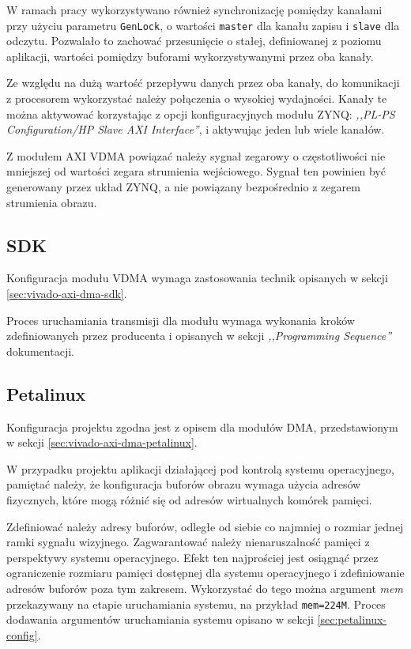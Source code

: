 {W ramach pracy wykorzystywano również synchronizację pomiędzy kanałami przy użyciu parametru \texttt{GenLock}, o wartości \texttt{master} dla kanału zapisu i \texttt{slave} dla odczytu. Pozwalało to zachować przesunięcie o stałej, definiowanej z poziomu aplikacji, wartości pomiędzy buforami wykorzystywanymi przez oba kanały.

Ze względu na dużą wartość przepływu danych przez oba kanały, do komunikacji z procesorem wykorzystać należy połączenia o wysokiej wydajności. Kanały te można aktywować korzystając z opcji konfiguracyjnych modułu ZYNQ: \emph{,,PL-PS Configuration/HP Slave AXI Interface''}, i aktywując jeden lub wiele kanałów.

Z modułem AXI VDMA powiązać należy sygnał zegarowy o częstotliwości nie mniejszej od wartości zegara strumienia wejściowego. Sygnał ten powinien być generowany przez układ ZYNQ, a nie powiązany bezpośrednio z zegarem strumienia obrazu.

\subsection{SDK}
Konfiguracja modułu VDMA wymaga zastosowania technik opisanych w sekcji \ref{sec:vivado-axi-dma-sdk}.

Proces uruchamiania transmisji dla modułu wymaga wykonania kroków zdefiniowanych przez producenta i opisanych w sekcji \textit{,,Programming Sequence''} dokumentacji. \cite{axi-vdma-guide}
\subsection{Petalinux}
Konfiguracja projektu zgodna jest z opisem dla modułów DMA, przedstawionym w sekcji \ref{sec:vivado-axi-dma-petalinux}.

W przypadku projektu aplikacji działającej pod kontrolą systemu operacyjnego, pamiętać należy, że konfiguracja buforów obrazu wymaga użycia adresów fizycznych, które mogą różnić się od adresów wirtualnych komórek pamięci.

Zdefiniować należy adresy buforów, odległe od siebie co najmniej o rozmiar jednej ramki sygnału wizyjnego. Zagwarantować należy nienaruszalność pamięci z perspektywy systemu operacyjnego. Efekt ten najprościej jest osiągnąć przez ograniczenie rozmiaru pamięci dostępnej dla systemu operacyjnego i zdefiniowanie adresów buforów poza tym zakresem. Wykorzystać do tego można argument \textit{mem} przekazywany na etapie uruchamiania systemu, na przykład \texttt{mem=224M}. Proces dodawania argumentów uruchamiania systemu opisano w sekcji \ref{sec:petalinux-config}.

}
